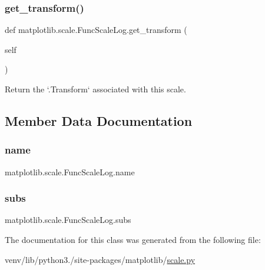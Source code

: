 \subsubsection{\texorpdfstring{get\+\_\+transform()}{get\_transform()}}
{\footnotesize\ttfamily def matplotlib.\+scale.\+Func\+Scale\+Log.\+get\+\_\+transform (\begin{DoxyParamCaption}\item[{}]{self }\end{DoxyParamCaption})}

\begin{DoxyVerb}Return the `.Transform` associated with this scale.\end{DoxyVerb}
 

\subsection{Member Data Documentation}
\mbox{\label{classmatplotlib_1_1scale_1_1FuncScaleLog_a55a251b6545764fe989bd8b3037ebc50}} 
\subsubsection{\texorpdfstring{name}{name}}
{\footnotesize\ttfamily matplotlib.\+scale.\+Func\+Scale\+Log.\+name\hspace{0.3cm}{\ttfamily [static]}}

\mbox{\label{classmatplotlib_1_1scale_1_1FuncScaleLog_ab14c6a8092aa679be91ac31cdff2daec}} 
\subsubsection{\texorpdfstring{subs}{subs}}
{\footnotesize\ttfamily matplotlib.\+scale.\+Func\+Scale\+Log.\+subs}



The documentation for this class was generated from the following file\+:\begin{DoxyCompactItemize}
\item 
venv/lib/python3./site-\/packages/matplotlib/\hyperlink{scale_8py}{scale.\+py}\end{DoxyCompactItemize}
